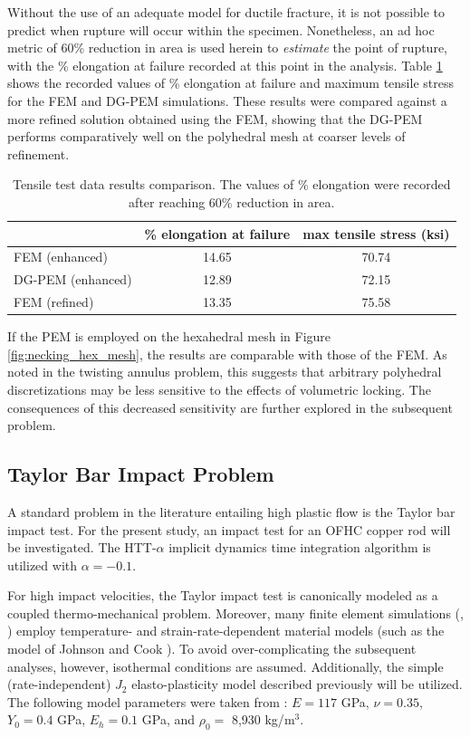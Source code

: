Without the use of an adequate model for ductile fracture, it is not possible to predict when rupture will occur within the specimen. Nonetheless, an ad hoc metric of 60\% reduction in area is used herein to \textit{estimate} the point of rupture, with the \% elongation at failure recorded at this point in the analysis. Table \ref{tab:tensile_test_data_results} shows the recorded values of \% elongation at failure and maximum tensile stress for the FEM and DG-PEM simulations. These results were compared against a more refined solution obtained using the FEM, showing that the DG-PEM performs comparatively well on the polyhedral mesh at coarser levels of refinement.

\begin{table}
\centering
\begin{tabular}{| l || c | c |}
    \hline
               & \% elongation at failure & max tensile stress (ksi) \\ \hline \hline
    FEM (enhanced)    & 14.65 & 70.74 \\ \hline
    DG-PEM (enhanced) & 12.89 & 72.15 \\ \hline
    FEM (refined)     & 13.35 & 75.58 \\
    \hline
\end{tabular}
\caption{Tensile test data results comparison. The values of \% elongation were recorded after reaching 60\% reduction in area.}
\label{tab:tensile_test_data_results}
\end{table}

If the PEM is employed on the hexahedral mesh in Figure \ref{fig:necking_hex_mesh}, the results are comparable with those of the FEM. As noted in the twisting annulus problem, this suggests that arbitrary polyhedral discretizations may be less sensitive to the effects of volumetric locking. The consequences of this decreased sensitivity are further explored in the subsequent problem.

\subsection*{Taylor Bar Impact Problem}

A standard problem in the literature entailing high plastic flow is the Taylor bar impact test. For the present study, an impact test for an OFHC copper rod will be investigated. The HTT-$\alpha$ implicit dynamics time integration algorithm \cite{Hilber&Hughes&Taylor:77} is utilized with $\alpha = -0.1$.

For high impact velocities, the Taylor impact test is canonically modeled as a coupled thermo-mechanical problem. Moreover, many finite element simulations (\cite{Heinstein:05}, \cite{Banerjee:05}) employ temperature- and strain-rate-dependent material models (such as the model of Johnson and Cook \cite{Johnson&Cook:83}). To avoid over-complicating the subsequent analyses, however, isothermal conditions are assumed. Additionally, the simple (rate-independent) $J_2$ elasto-plasticity model described previously will be utilized. The following model parameters were taken from \cite{Erhart:11}: $E = 117$ GPa, $\nu = 0.35$, $Y_0 = 0.4$ GPa, $E_h = 0.1$ GPa, and $\rho_0=$ 8,930 kg/$\text{m}^3$.


